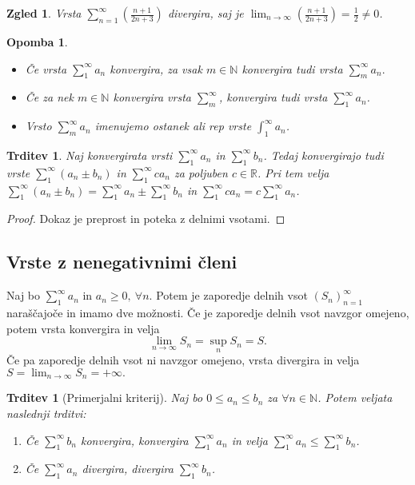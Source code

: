 \documentclass[10pt, a4paper]{article}
\newtheorem{trditev}[izr]{Trditev}
\newtheorem*{opomba}{Opomba}
\newtheorem{zgled}{Zgled}[section]
\newenvironment{noticeC}{%
  \tcolorbox[%
  notitle,
  empty,
  enhanced,  %
  breakable,
  coltext=black, 
  fontupper=\rmfamily,
  parbox=false,
  noparskip,
  sharp corners,
  boxrule=-1pt,  %
  frame hidden,
  left=7pt,  %
  right=7pt,
  top=5pt,
  bottom=5pt,
  before skip=2.5ex plus 2pt,
  after skip=2.5ex plus 2pt,
  overlay unbroken and last={%
  },
  ]}
{\endtcolorbox}
\newenvironment{dokaz}%
  {\begin{noticeC}\begin{proof}}%
  {\end{proof}\end{noticeC}}
\newcommand{\N}{\mathbb {N}}
\newcommand{\R}{\mathbb {R}}
\newcommand{\limzap}[1]{\lim_{n \to \infty} {#1}}
\begin{document}
\begin{zgled}
    Vrsta $\sum _{n=1} ^\infty \left(\frac{n+1}{2n + 3}\right)$ divergira, saj je $\limzap{\left(\frac{n+1}{2n + 3}\right)} = \frac{1}{2} \neq 0$.
\end{zgled}

\begin{opomba}
    \begin{itemize}
        \item Če vrsta $\sum_1 ^\infty a_n$ konvergira, za vsak $m \in \N$ konvergira tudi vrsta $\sum_m ^\infty a_n.$
        \item Če za nek $m \in \N$ konvergira vrsta $\sum_m ^\infty$, konvergira tudi vrsta $\sum_1 ^\infty a_n$.
        \item Vrsto $\sum_m ^\infty a_n$ imenujemo ostanek ali rep vrste $\int_1 ^\infty a_n$.
    \end{itemize}
\end{opomba}

\begin{trditev}
    Naj konvergirata vrsti $\sum_1 ^\infty a_n$ in $\sum_1 ^\infty b_n$.
    Tedaj konvergirajo tudi vrste $\sum_1 ^\infty (a_n \pm b_n)$ in $\sum_1 ^\infty c a_n$ za poljuben $c \in \R$.
    Pri tem velja $\sum_1 ^\infty (a_n \pm b_n) = \sum_1 ^\infty a_n \pm \sum_1 ^\infty b_n$ in $\sum_1 ^\infty c a_n = c \sum_1 ^\infty a_n$. 
\end{trditev}

\begin{dokaz}
    Dokaz je preprost in poteka z delnimi vsotami.
\end{dokaz}

\subsection{Vrste z nenegativnimi členi}

Naj bo $\sum_1 ^\infty a_n$ in $a_n \geq 0,\ \forall n.$
Potem je zaporedje delnih vsot $(S_n)_{n=1} ^\infty$ naraščajoče in imamo dve možnosti.
Če je zaporedje delnih vsot navzgor omejeno, potem vrsta konvergira in velja $$\limzap{S_n} = \sup_n S_n = S.$$
Če pa zaporedje delnih vsot ni navzgor omejeno, vrsta divergira in velja $S = \limzap{S_n} = +\infty.$

\begin{trditev}[Primerjalni kriterij]
    Naj bo $0 \leq a_n \leq b_n$ za $\forall n \in \N$. Potem veljata naslednji trditvi:
    \begin{enumerate}
        \item Če $\sum_1 ^\infty b_n$ konvergira, konvergira $\sum_1 ^\infty a_n$ in velja $\sum_1 ^\infty a_n \leq \sum_1 ^\infty b_n$.
        \item Če $\sum_1 ^\infty a_n$ divergira, divergira $\sum_1 ^\infty b_n$.
    \end{enumerate}
\end{trditev}
\end{document}
